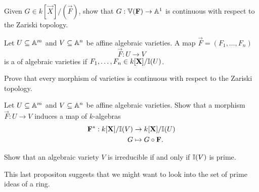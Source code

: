 \documentclass{ximera}
\begin{document}
\begin{exercise}
  Given $G\in k[\vec{X}]/(\vec{F})$, show that $G: \mathbb V(\mathbf{F})\to
  \mathbb A^1$ is continuous with respect to the Zariski topology.
\end{exercise}



\begin{definition}
  Let $U\subseteq\mathbb A^m$ and $V\subseteq\mathbb A^n$ be affine algebraic
  varieties. A map $\vec{F} = (F_1,\dots,F_n)$
  \[
  \vec{F}: U\to V
  \]
  is a  of algebraic varieties if $F_1,\dots,F_n\in k[\mathbf X]/\mathbb I(U)$.
\end{definition}

\begin{exercise}
  Prove that every morphism of varieties is continuous with respect to
  the Zariski topology.
\end{exercise}

\begin{exercise}
   Let $U\subseteq\mathbb A^m$ and $V\subseteq\mathbb A^n$ be affine algebraic varieties. Show that a
   morphism $\vec{F}: U\to V$ induces a map of $k$-algebras
   \begin{align*}
     \mathbf{F}^*:  k[\mathbf X]/\mathbb I(V) &\to k[\mathbf X]/\mathbb I(U)\\
     G &\mapsto G\circ \mathbf{F}.
    \end{align*}
\end{exercise}


\begin{proposition}%
  Show that an algebraic variety $V$ is irreducible if and only if
  $\mathbb I(V)$ is prime.
    
\end{proposition}


This last propositon suggests that we might want to look into the set
of prime ideas of a ring.
\end{document}
